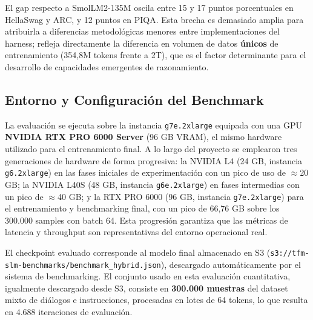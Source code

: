 El gap respecto a SmolLM2-135M oscila entre 15 y 17 puntos porcentuales en HellaSwag y ARC, y 12 puntos en PIQA. Esta brecha es demasiado amplia para atribuirla a diferencias metodológicas menores entre implementaciones del harness; refleja directamente la diferencia en volumen de datos \textbf{únicos} de entrenamiento (354,8M tokens frente a 2T), que es el factor determinante para el desarrollo de capacidades emergentes de razonamiento.

\subsection{Entorno y Configuración del Benchmark}
\label{subsec:benchmark_setup}

La evaluación se ejecuta sobre la instancia \texttt{g7e.2xlarge} equipada con una GPU \textbf{NVIDIA RTX PRO 6000 Server} (96 GB VRAM), el mismo hardware utilizado para el entrenamiento final. A lo largo del proyecto se emplearon tres generaciones de hardware de forma progresiva: la NVIDIA L4 (24 GB, instancia \texttt{g6.2xlarge}) en las fases iniciales de experimentación con un pico de uso de $\approx$20 GB; la NVIDIA L40S (48 GB, instancia \texttt{g6e.2xlarge}) en fases intermedias con un pico de $\approx$40 GB; y la RTX PRO 6000 (96 GB, instancia \texttt{g7e.2xlarge}) para el entrenamiento y benchmarking final, con un pico de 66,76 GB sobre los 300.000 samples con batch 64. Esta progresión garantiza que las métricas de latencia y throughput son representativas del entorno operacional real.

El checkpoint evaluado corresponde al modelo final almacenado en S3 (\texttt{s3://tfm-slm-benchmarks/benchmark\_hybrid.json}), descargado automáticamente por el sistema de benchmarking. El conjunto usado en esta evaluación cuantitativa, igualmente descargado desde S3, consiste en \textbf{300.000 muestras} del dataset mixto de diálogos e instrucciones, procesadas en lotes de 64 tokens, lo que resulta en 4.688 iteraciones de evaluación.

